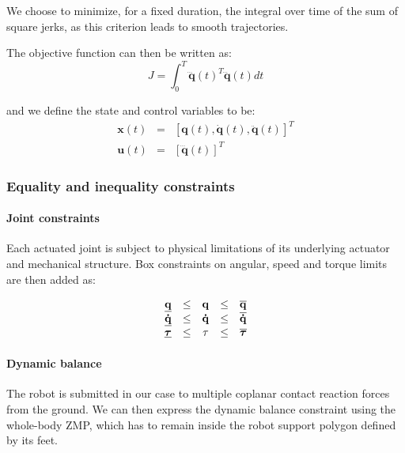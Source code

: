 We choose to minimize, for a fixed duration, the integral over time of
the sum of square jerks, as this criterion leads to smooth trajectories.

The objective function can then be written as:
\begin{equation}
  J = \int_{0}^{T}\mathbf{\dddot{q}}(t)^T\mathbf{\dddot{q}}(t) dt
  \label{objective-function}
\end{equation}

\noindent and we define the state and control variables to be:
\begin{equation}
  \begin{array}{rcl}
  \mathbf{x}(t) & = & [\mathbf{q}(t), \mathbf{\dot{q}}(t), \mathbf{\ddot{q}}(t)]^T \\
  \mathbf{u}(t) & = & [\mathbf{\dddot{q}}(t)]^T
  \end{array}
  \label{variables}
\end{equation}

\subsubsection{Equality and inequality constraints}

\paragraph{Joint constraints}
Each actuated joint is subject to physical limitations of its
underlying actuator and mechanical structure. Box constraints on
angular, speed and torque limits are then added as:

\begin{equation}
  \begin{array}{rcccl}
    \underline{\mathbf{q}} & \le & \mathbf{q} & \le & \overline{\mathbf{q}} \\
    \underline{\mathbf{\dot{q}}} & \le & \mathbf{\dot{q}} & \le & \overline{\mathbf{\dot{q}}} \\
    \underline{\boldsymbol{\tau}} & \le & \mathbf{\tau} & \le & \overline{\boldsymbol{\tau}}
  \end{array}
  \label{joint-constraints}
\end{equation}

\paragraph{Dynamic balance}
The robot is submitted in our case to multiple coplanar contact
reaction forces from the ground. We can then express the dynamic
balance constraint using the whole-body ZMP, which has to remain
inside the robot support polygon defined by its feet.

